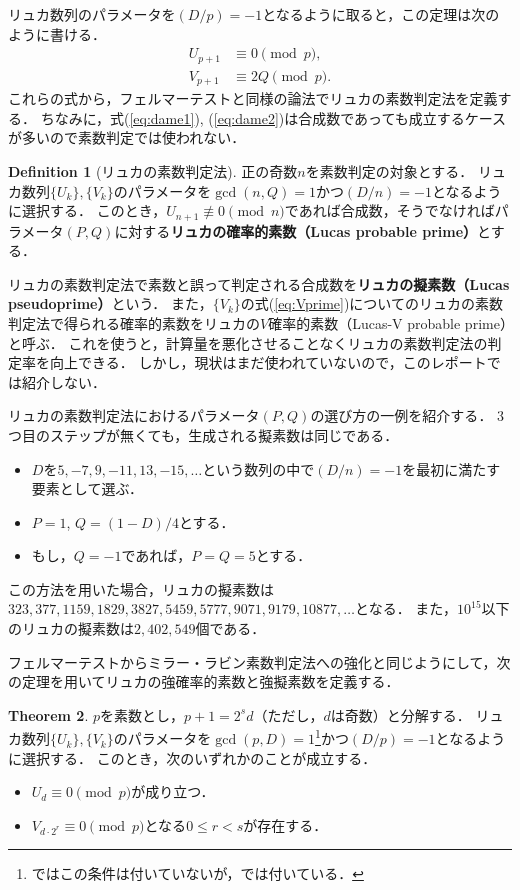 \documentclass[uplatex]{jsarticle}
\theoremstyle{definition}
\newtheorem{dfn}{Definition}[section]
\newtheorem{thm}[dfn]{Theorem}
\begin{document}
リュカ数列のパラメータを$(D/p)=-1$となるように取ると，この定理は次のように書ける．
\begin{align}
    U_{p+1} &\equiv 0 \pmod{p}, \\
    V_{p+1} &\equiv 2Q \pmod{p}.\label{eq:Vprime}
\end{align}
これらの式から，フェルマーテストと同様の論法でリュカの素数判定法を定義する．
ちなみに，式(\ref{eq:dame1}), (\ref{eq:dame2})は合成数であっても成立するケースが多いので素数判定では使われない．

\begin{dfn}[リュカの素数判定法]
    正の奇数$n$を素数判定の対象とする．
    リュカ数列$\{U_k\}, \{V_k\}$のパラメータを$\gcd(n, Q)=1$かつ$(D/n)=-1$となるように選択する．
    このとき，$U_{n+1} \not\equiv 0 \pmod{n}$であれば合成数，そうでなければパラメータ$(P,Q)$に対する\textbf{リュカの確率的素数（Lucas probable prime）}とする．
\end{dfn}

リュカの素数判定法で素数と誤って判定される合成数を\textbf{リュカの擬素数（Lucas pseudoprime）}という．
また，$\{V_k\}$の式(\ref{eq:Vprime})についてのリュカの素数判定法で得られる確率的素数をリュカの$V$確率的素数（Lucas-V probable prime）と呼ぶ．
これを使うと，計算量を悪化させることなくリュカの素数判定法の判定率を向上できる．
しかし，現状はまだ使われていないので，このレポートでは紹介しない．

リュカの素数判定法におけるパラメータ$(P,Q)$の選び方の一例を紹介する\cite{baillie2021strengthening,baillie1980lucas}．
3つ目のステップが無くても，生成される擬素数は同じである．
\begin{itemize}
    \item $D$を$5, -7, 9, -11, 13, -15, \dots$という数列の中で$(D/n)=-1$を最初に満たす要素として選ぶ．
    \item $P=1$, $Q=(1-D)/4$とする．
    \item もし，$Q=-1$であれば，$P=Q=5$とする．
\end{itemize}
この方法を用いた場合，リュカの擬素数は$323, 377, 1159, 1829, 3827, 5459, 5777, 9071, 9179, 10877,\dots$となる．
また，$10^{15}$以下のリュカの擬素数は$2{,}402{,}549$個である．

フェルマーテストからミラー・ラビン素数判定法への強化と同じようにして，次の定理を用いてリュカの強確率的素数と強擬素数を定義する．

\begin{thm}
    $p$を素数とし，$p+1=2^sd$（ただし，$d$は奇数）と分解する．
    リュカ数列$\{U_k\}, \{V_k\}$のパラメータを$\gcd(p,D)=1$\footnote{\cite{baillie2021strengthening}ではこの条件は付いていないが，\cite{baillie1980lucas}では付いている．}かつ$(D/p)=-1$となるように選択する．
    このとき，次のいずれかのことが成立する．
    \begin{itemize}
        \item $U_d \equiv 0 \pmod{p}$が成り立つ．
        \item $V_{d \cdot 2^r} \equiv 0 \pmod{p}$となる$0 \leq r < s$が存在する．
    \end{itemize}
\end{thm}
\end{document}
